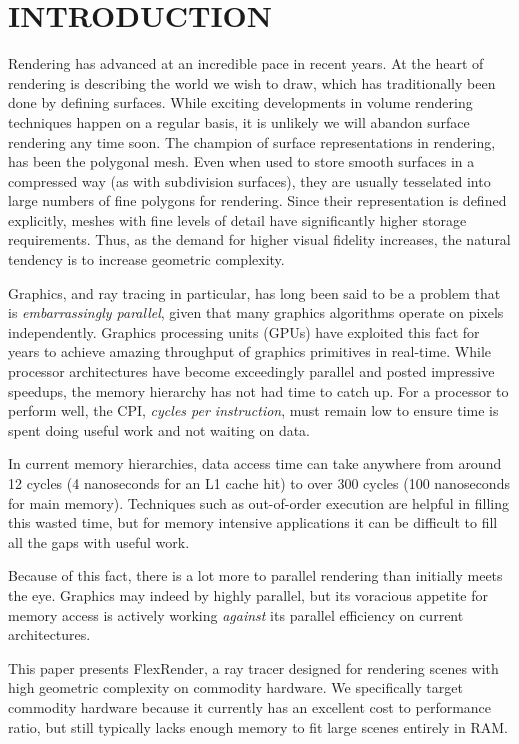 \documentclass[a4paper,twoside]{article}
\begin{document}
\section{\uppercase{Introduction}}
Rendering has advanced at an incredible pace in recent years. At the heart of
rendering is describing the world we wish to draw, which has traditionally been
done by defining surfaces. While exciting developments in volume rendering
techniques happen on a regular basis, it is unlikely we will abandon surface
rendering any time soon. The champion of surface representations in rendering,
has been the polygonal mesh. Even when used to store smooth surfaces in a
compressed way (as with subdivision surfaces), they are usually tesselated into
large numbers of fine polygons for rendering. Since their representation is
defined explicitly, meshes with fine levels of detail have significantly
higher storage requirements. Thus, as the demand for higher visual fidelity
increases, the natural tendency is to increase geometric complexity.

Graphics, and ray tracing in particular, has long been said to be a problem that
is \emph{embarrassingly parallel}, given that many graphics algorithms operate
on pixels independently. Graphics processing units (GPUs) have exploited this
fact for years to achieve amazing throughput of graphics primitives in real-time.
While processor architectures have become exceedingly parallel and posted
impressive speedups, the memory hierarchy has not had time to catch up. For a
processor to perform well, the CPI, \emph{cycles per instruction}, must remain
low to ensure time is spent doing useful work and not waiting on data.

In current memory hierarchies, data access time can take anywhere from around
12 cycles (4 nanoseconds for an L1 cache hit) to over 300 cycles (100
nanoseconds for main memory). Techniques such as out-of-order execution are
helpful in filling this wasted time, but for memory intensive applications it
can be difficult to fill all the gaps with useful work.

Because of this fact, there is a lot more to parallel rendering than initially
meets the eye. Graphics may indeed by highly parallel, but its voracious
appetite for memory access is actively working \emph{against} its parallel
efficiency on current architectures.

This paper presents FlexRender, a ray tracer designed for rendering scenes
with high geometric complexity on commodity hardware. We specifically target
commodity hardware because it currently has an excellent cost to performance
ratio, but still typically lacks enough memory to fit large scenes entirely in
RAM.
\end{document}
